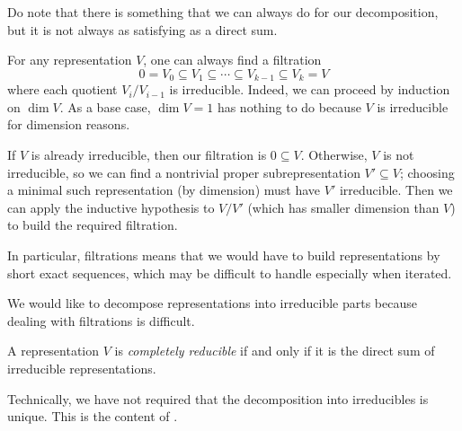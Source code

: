 \documentclass[../notes.tex]{subfiles}
\begin{document}
Do note that there is something that we can always do for our decomposition, but it is not always as satisfying as a direct sum.
\begin{remark}
	For any representation $V$, one can always find a filtration
	\[0=V_0\subseteq V_1\subseteq\cdots\subseteq V_{k-1}\subseteq V_k=V\]
	where each quotient $V_i/V_{i-1}$ is irreducible. Indeed, we can proceed by induction on $\dim V$. As a base case, $\dim V=1$ has nothing to do because $V$ is irreducible for dimension reasons.
	
	If $V$ is already irreducible, then our filtration is $0\subseteq V$. Otherwise, $V$ is not irreducible, so we can find a nontrivial proper subrepresentation $V'\subseteq V$; choosing a minimal such representation (by dimension) must have $V'$ irreducible. Then we can apply the inductive hypothesis to $V/V'$ (which has smaller dimension than $V$) to build the required filtration.
\end{remark}
In particular, filtrations means that we would have to build representations by short exact sequences, which may be difficult to handle especially when iterated.

We would like to decompose representations into irreducible parts because dealing with filtrations is difficult.
\begin{definition}
	A representation $V$ is \textit{completely reducible} if and only if it is the direct sum of irreducible representations.
\end{definition}
\begin{remark}
	Technically, we have not required that the decomposition into irreducibles is unique. This is the content of .
\end{remark}
\end{document}
